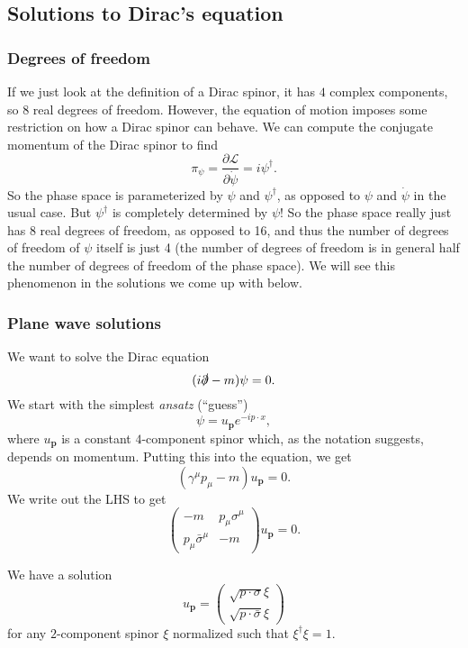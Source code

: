 \documentclass[a4paper]{article}
\begin{document}
\subsection{Solutions to Dirac's equation}
\subsubsection*{Degrees of freedom}
If we just look at the definition of a Dirac spinor, it has $4$ complex components, so $8$ real degrees of freedom. However, the equation of motion imposes some restriction on how a Dirac spinor can behave. We can compute the conjugate momentum of the Dirac spinor to find
\[
  \pi_\psi = \frac{\partial \mathcal{L}}{\partial \dot\psi} = i \psi^\dagger.
\]
So the phase space is parameterized by $\psi$ and $\psi^\dagger$, as opposed to $\psi$ and $\dot\psi$ in the usual case. But $\psi^\dagger$ is completely determined by $\psi$! So the phase space really just has 8 real degrees of freedom, as opposed to 16, and thus the number of degrees of freedom of $\psi$ itself is just 4 (the number of degrees of freedom is in general half the number of degrees of freedom of the phase space). We will see this phenomenon in the solutions we come up with below. %

\subsubsection*{Plane wave solutions}
We want to solve the Dirac equation
\[
  (i \slashed \partial - m) \psi = 0.
\]
We start with the simplest \emph{ansatz} (``guess'')
\[
  \psi = u_\mathbf{p} e^{- i p \cdot x},
\]
where $u_\mathbf{p}$ is a constant $4$-component spinor which, as the notation suggests, depends on momentum. Putting this into the equation, we get
\[
  (\gamma^\mu p_\mu - m) u_\mathbf{p} = 0.
\]
We write out the LHS to get
\[
  \begin{pmatrix}
    -m & p_\mu \sigma^\mu\\
    p_\mu \bar\sigma^\mu & -m
  \end{pmatrix} u_\mathbf{p} = 0.
\]
\begin{prop}
  We have a solution
  \[
    u_\mathbf{p} =
    \begin{pmatrix}
      \sqrt{p \cdot \sigma} \xi\\
      \sqrt{p \cdot \bar\sigma} \xi
    \end{pmatrix}
  \]
  for any $2$-component spinor $\xi$ normalized such that $\xi^\dagger \xi = 1$.
\end{prop}
\end{document}
